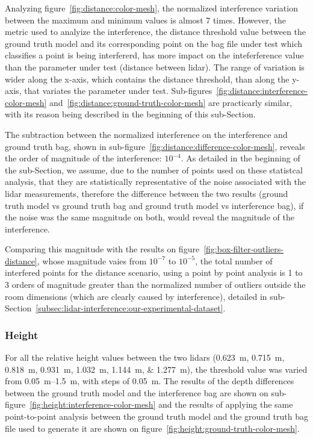 Analyzing figure~\ref{fig:distance:color-mesh}, the normalized interference variation between the maximum and minimum values is almost 7 times. However, the metric used to analyize the interference, the distance threshold value between the ground truth model and its corresponding point on the bag file under test which classifies a point is being interfererd, has more impact on the inteferference value than the parameter under test (distance between \ac{lidar}). The range of variation is wider along the x-axis, which contains the distance threshold, than along the y-axis, that variates the parameter under test. Sub-figures~\ref{fig:distance:interference-color-mesh} and~\ref{fig:distance:ground-truth-color-mesh} are practicarly similar, with its reason being described in the beginning of this sub-Section.

The subtraction between the normalized interference on the interference and ground truth bag, shown in sub-figure~\ref{fig:distance:difference-color-mesh}, reveals the order of magnitude of the interference: $10^{-4}$. As detailed in the beginning of the sub-Section, we assume, due to the number of points used on these statistcal analysis, that they are statistically representative of the noise associated with the \ac{lidar} measurements, therefore the difference between the two results (ground truth model vs ground truth bag and ground truth model vs interference bag), if the noise was the same magnitude on both, would reveal the magnitude of the interference. 

Comparing this magnitude with the results on figure~\ref{fig:box-filter-outliers-distance}, whose magnitude vaies from $10^{-7}$ to $10^{-5}$, the total number of interfered points for the distance scenario, using a point by point analysis is 1 to 3 orders of magnitude greater than the normalized number of outliers outside the room dimensions (which are clearly caused by interference), detailed in sub-Section~\ref{subsec:lidar-interference:our-experimental-dataset}.

\subsubsection{Height}
For all the relative height values between the two \acp{lidar} (\SIlist[list-units=single]{0.623; 0.715; 0.818; 0.931; 1.032; 1.144; 1.277}{\meter}), the threshold value was varied from \SIrange{0.05}{1.5}{\meter}, with steps of \SI{0.05}{\meter}. The results of the depth differences between the ground truth model and the interference bag are shown on sub-figure~\ref{fig:height:interference-color-mesh} and the results of applying the same point-to-point analysis between the ground truth model and the ground truth bag file used to generate it are shown on figure~\ref{fig:height:ground-truth-color-mesh}.

